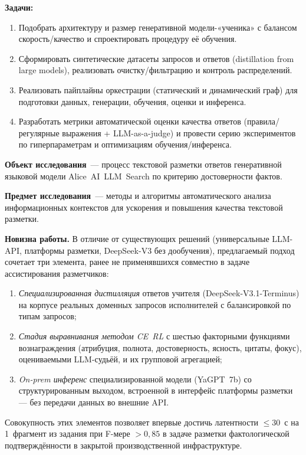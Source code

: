 \documentclass[times]{itmo-student-thesis}
\begin{document}
\textbf{Задачи:}
\begin{enumerate}
    \item Подобрать архитектуру и размер генеративной модели-«ученика»
          с балансом скорость/качество и спроектировать процедуру её обучения.
    \item Сформировать синтетические датасеты запросов и ответов
          (distillation from large models), реализовать очистку/фильтрацию
          и контроль распределений.
    \item Реализовать пайплайны оркестрации (статический и динамический граф)
          для подготовки данных, генерации, обучения, оценки и инференса.
    \item Разработать метрики автоматической оценки качества ответов
          (правила/регулярные выражения + LLM-as-a-judge) и провести серию
          экспериментов по гиперпараметрам и оптимизациям обучения/инференса.
\end{enumerate}

\textbf{Объект исследования}~--- процесс текстовой разметки ответов
генеративной языковой модели Alice~AI~LLM~Search по критерию достоверности
фактов.

\textbf{Предмет исследования}~--- методы и алгоритмы автоматического анализа
информационных контекстов для ускорения и повышения качества текстовой
разметки.

\textbf{Новизна работы.} В отличие от существующих решений (универсальные
LLM-API, платформы разметки, DeepSeek-V3 без дообучения), предлагаемый
подход сочетает три элемента, ранее не применявшихся совместно в задаче
ассистирования разметчиков:
\begin{enumerate}
    \item \emph{Специализированная дистилляция} ответов учителя
    (DeepSeek-V3.1-Terminus) на корпусе реальных доменных запросов
    исполнителей с балансировкой по типам запросов;
    \item \emph{Стадия выравнивания методом CE~RL} с шестью факторными
    функциями вознаграждения (атрибуция, полнота, достоверность,
    ясность, цитаты, фокус), оцениваемыми LLM-судьёй, и
    их групповой агрегацией;
    \item \emph{On-prem инференс} специализированной модели (YaGPT~7b)
    со структурированным выходом, встроенной в интерфейс платформы
    разметки — без передачи данных во внешние API.
\end{enumerate}
Совокупность этих элементов позволяет впервые достичь латентности
$\le 30$~с на 1~фрагмент из задания при F-мере $> 0{,}85$ в задаче разметки фактологической
подтверждённости в закрытой производственной инфраструктуре.
\end{document}
